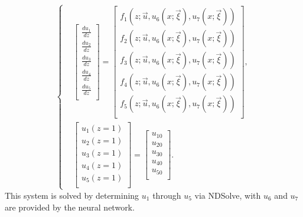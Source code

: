 \documentclass[11pt]{article}
\begin{document}
\begin{enumerate}
	\begin{equation}
		\left\{
		\begin{aligned}
			& \begin{bmatrix}
				\frac{{du_1}}{{dz}} \\
				\frac{{du_2}}{{dz}} \\
				\frac{{du_3}}{{dz}} \\
				\frac{{du_4}}{{dz}} \\
				\frac{{du_5}}{{dz}} \\
			\end{bmatrix} = \begin{bmatrix}
				f_1\left( {z;\vec u,{u_6}\left( {x;\vec \xi } \right), {u_7}\left( {x;\vec \xi } \right)} \right) \\
				f_2\left( {z;\vec u,{u_6}\left( {x;\vec \xi } \right), {u_7}\left( {x;\vec \xi } \right)} \right) \\
				f_3\left( {z;\vec u,{u_6}\left( {x;\vec \xi } \right), {u_7}\left( {x;\vec \xi } \right)} \right) \\
				f_4\left( {z;\vec u,{u_6}\left( {x;\vec \xi } \right), {u_7}\left( {x;\vec \xi } \right)} \right) \\
				f_5\left( {z;\vec u,{u_6}\left( {x;\vec \xi } \right), {u_7}\left( {x;\vec \xi } \right)} \right) \\
			\end{bmatrix}, \\
			& \begin{bmatrix}
					u_1\left( {z = 1} \right) \\
				u_2\left( {z = 1} \right) \\
				u_3\left( {z = 1} \right) \\
				u_4\left( {z = 1} \right) \\
				u_5\left( {z = 1} \right) \\
			\end{bmatrix} = \begin{bmatrix}
				u_{10} \\
				u_{20} \\
				u_{30} \\
				u_{40} \\
				u_{50} \\
			\end{bmatrix}.
		\end{aligned}
		\right.
	\end{equation}
	This system is solved by determining $u_{1}$ through $u_{5}$ via NDSolve, with $u_{6}$ and $u_{7}$ are provided by the neural network.
	

\end{enumerate}
\end{document}
